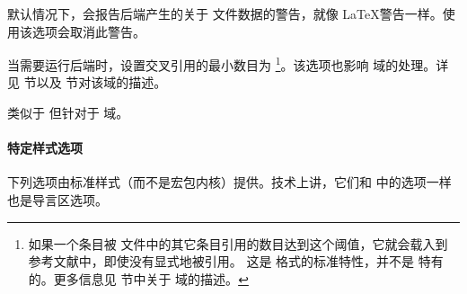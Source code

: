 \begin{optionlist}

默认情况下，\biblatex 会报告后端产生的关于  文件数据的警告，就像 \LaTeX 警告一样。使用该选项会取消此警告。


当需要运行后端时，设置交叉引用的最小数目为 
\footnote{如果一个条目被  文件中的其它条目引用的数目达到这个阈值，它就会载入到参考文献中，即使没有显式地被引用。	这是 \bibtex  格式的标准特性，并不是 \biblatex 特有的。更多信息见  节中关于  域的描述。}。该选项也影响  域的处理。详见  节以及  节对该域的描述。


类似于  但针对于  域。

\end{optionlist}

\paragraph{特定样式选项}%
\label{use:opt:pre:bbx}

下列选项由标准样式（而不是宏包内核）提供。技术上讲，它们和  中的选项一样也是导言区选项。

